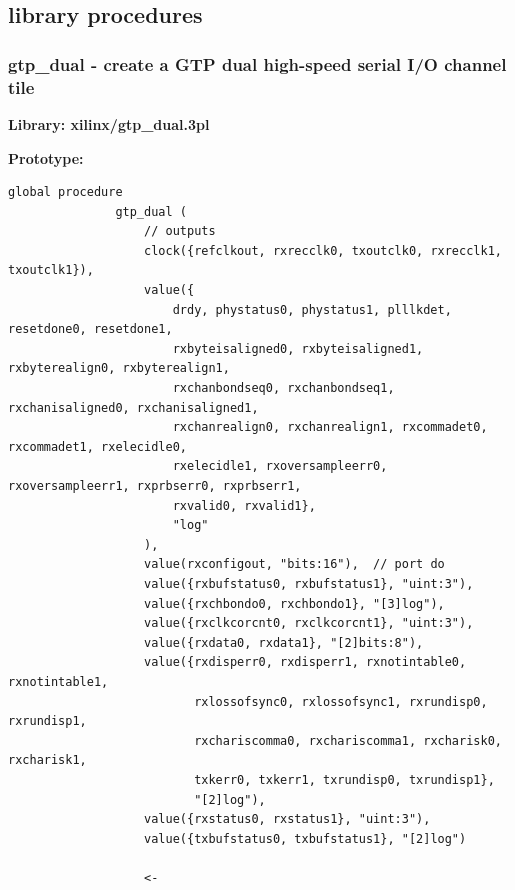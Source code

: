     \subsection{library procedures}
    

        \subsubsection{gtp\_dual - create a GTP dual high-speed serial I/O channel tile}\label{sec:lpgtpdual}

            {\bf Library: xilinx/gtp\_dual.3pl}

            {\bf Prototype:} \\
            \vsp
            \begin{lstlisting}[gobble=12, language=threepl]
               global procedure
               gtp_dual (
                   // outputs
                   clock({refclkout, rxrecclk0, txoutclk0, rxrecclk1, txoutclk1}),
                   value({
                       drdy, phystatus0, phystatus1, plllkdet, resetdone0, resetdone1,
                       rxbyteisaligned0, rxbyteisaligned1, rxbyterealign0, rxbyterealign1,
                       rxchanbondseq0, rxchanbondseq1, rxchanisaligned0, rxchanisaligned1,
                       rxchanrealign0, rxchanrealign1, rxcommadet0, rxcommadet1, rxelecidle0,
                       rxelecidle1, rxoversampleerr0, rxoversampleerr1, rxprbserr0, rxprbserr1,
                       rxvalid0, rxvalid1},        
                       "log"
                   ),
                   value(rxconfigout, "bits:16"),  // port do
                   value({rxbufstatus0, rxbufstatus1}, "uint:3"),
                   value({rxchbondo0, rxchbondo1}, "[3]log"),
                   value({rxclkcorcnt0, rxclkcorcnt1}, "uint:3"),
                   value({rxdata0, rxdata1}, "[2]bits:8"),
                   value({rxdisperr0, rxdisperr1, rxnotintable0, rxnotintable1,
                          rxlossofsync0, rxlossofsync1, rxrundisp0, rxrundisp1,
                          rxchariscomma0, rxchariscomma1, rxcharisk0, rxcharisk1,
                          txkerr0, txkerr1, txrundisp0, txrundisp1},
                          "[2]log"),
                   value({rxstatus0, rxstatus1}, "uint:3"),
                   value({txbufstatus0, txbufstatus1}, "[2]log")

                   <-


\end{lstlisting}
